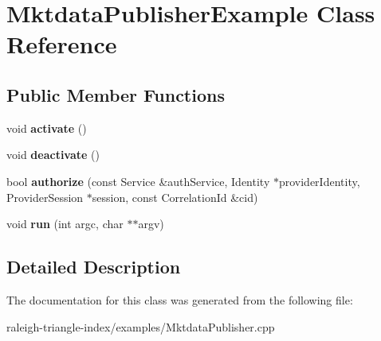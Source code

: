 \section{Mktdata\+Publisher\+Example Class Reference}
\label{class_mktdata_publisher_example}
\subsection*{Public Member Functions}
\begin{DoxyCompactItemize}
\item 
void {\bfseries activate} ()\label{class_mktdata_publisher_example_a3c33e6fc115dff9b00de844e0015b296}

\item 
void {\bfseries deactivate} ()\label{class_mktdata_publisher_example_a29e66960322b1e422b38cad025fe1807}

\item 
bool {\bfseries authorize} (const Service \&auth\+Service, Identity $\ast$provider\+Identity, Provider\+Session $\ast$session, const Correlation\+Id \&cid)\label{class_mktdata_publisher_example_ad3f815d8bc73381f8b7d279fc7df0924}

\item 
void {\bfseries run} (int argc, char $\ast$$\ast$argv)\label{class_mktdata_publisher_example_ac849e76b3ed2cd71d4e3d5bf472ed4ad}

\end{DoxyCompactItemize}


\subsection{Detailed Description}


The documentation for this class was generated from the following file\+:\begin{DoxyCompactItemize}
\item 
raleigh-\/triangle-\/index/examples/Mktdata\+Publisher.\+cpp\end{DoxyCompactItemize}
